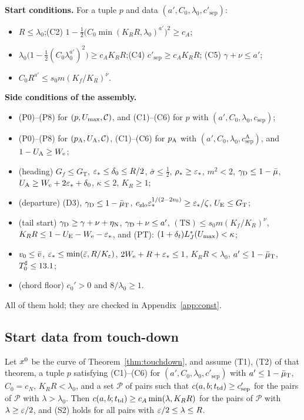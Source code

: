 \medskip\noindent\textbf{Start conditions.} For a tuple $p$ and data $(a',C_0,\lambda_0,c'_{\mathrm{sep}})$:
\begin{itemize}
\item[(C1)] $R\le\lambda_0$;\qquad(C2) $1-\frac12\bigl(C_0\min(K_RR,\lambda_0)^{a'}\bigr)^2\ge c_A$;
\item[(C3)] $\lambda_0\bigl(1-\frac12(C_0\lambda_0^{a'})^2\bigr)\ge c_AK_RR$;\qquad(C4) $c'_{\mathrm{sep}}\ge c_AK_RR$;\qquad
(C5) $\gamma+\nu\le a'$;
\item[(C6)] $C_0R^{a'}\le s_0m(K_f/K_R)^\nu$.
\end{itemize}

\noindent\textbf{Side conditions of the assembly.}
\begin{itemize}
\item[(A1)] (P0)--(P8) for $(p,U_{\max},\mathcal C)$, and (C1)--(C6) for $p$ with $(a',C_0,\lambda_0,c_{\mathrm{sep}})$;
\item[(A2)] (P0)--(P8) for $(p_{\mathrm A},U_{\mathrm A},\mathcal C)$, (C1)--(C6) for $p_{\mathrm A}$ with $(a',C_0,\lambda_0,c_{\mathrm{sep}}^{\mathrm A})$, and
$1-U_{\mathrm A}\ge W_{\mathrm e}$;
\item[(A3)] (heading) $G_f\le G_{\mathrm T}$, $\varepsilon_*\le\delta_0\le R/2$, $\bar\sigma\le\frac12$, $\rho_*\ge\varepsilon_*$, $m^2<2$,
$\gamma_{\mathrm D}\le1-\bar\mu$, $U_{\mathrm A}\ge W_{\mathrm e}+2\varepsilon_*+\delta_0$, $\kappa\le2$, $K_R\ge1$;
\item[(A4)] (departure) (D3), $\gamma_{\mathrm D}\le1-\bar\mu_{\mathrm T}$, $c_{\mathrm{zlo}}\varepsilon_*^{1/(2-2v_0)}\ge\varepsilon_*/\zeta$, $U_{\mathrm E}\le G_{\mathrm T}$;
\item[(A5)] (tail start) $\gamma_{\mathrm D}\ge\gamma+\nu+\eta_{\mathrm N}$, $\gamma_{\mathrm D}+\nu\le a'$, $\mathrm{(TS)}\le s_0m(K_f/K_R)^\nu$,
$K_RR\le1-U_{\mathrm E}-W_{\mathrm e}-\varepsilon_*$, and (PT): $(1+\delta_t)L^*_J(U_{\max})<\kappa$;
\item[(A6)] $v_0\le\bar v$, $\varepsilon_*\le\min(\bar\varepsilon,R/K_\varepsilon)$, $2W_{\mathrm e}+R+\varepsilon_*\le1$, $K_RR<\lambda_0$, $a'\le1-\bar\mu_{\mathrm T}$, $T_0^\sharp\le13.1$;
\item[(A7)] (chord floor) $c_0'>0$ and $8/\lambda_0\ge1$.
\end{itemize}
All of them hold; they are checked in Appendix~\ref{app:const}.

\subsection{Start data from touch-down}

\begin{lemma}\label{lem:start}
Let $x^0$ be the curve of Theorem~\ref{thm:touchdown}, and assume \textup{(T1)}, \textup{(T2)} of that theorem, a tuple $p$ satisfying
\textup{(C1)--(C6)} for $(a',C_0,\lambda_0,c'_{\mathrm{sep}})$ with $a'\le1-\bar\mu_{\mathrm T}$, $C_0=c_N$, $K_RR<\lambda_0$, and a set
$\mathcal P$ of pairs such that $c(a,b;t_{\mathrm{td}})\ge c'_{\mathrm{sep}}$ for the pairs of $\mathcal P$ with $\lambda>\lambda_0$. Then
$c(a,b;t_{\mathrm{td}})\ge c_A\min(\lambda,K_RR)$ for the pairs of $\mathcal P$ with $\lambda\ge\varepsilon/2$, and
\textup{(S2)} holds for all pairs with $\varepsilon/2\le\lambda\le R$.
\end{lemma}

